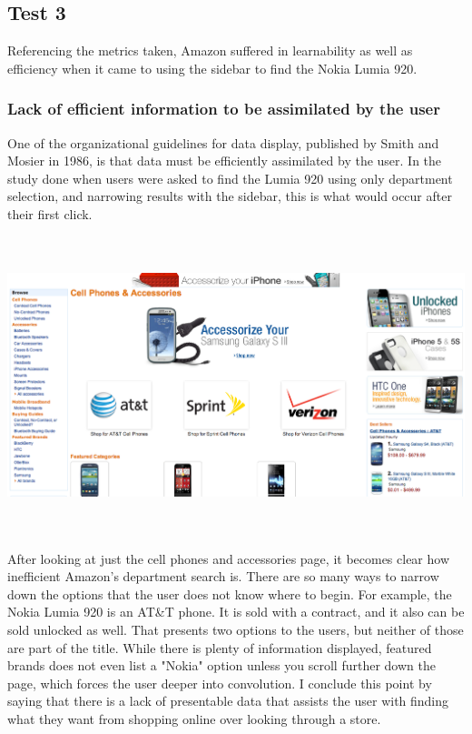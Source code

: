 \documentclass[11pt, oneside]{article}   	%
\begin{document}
\subsection{Test 3}
Referencing the metrics taken, Amazon suffered in learnability as well as efficiency when it came to using the sidebar to find the Nokia Lumia 920.
\subsubsection{Lack of efficient information to be assimilated by the user}
One of the organizational guidelines for data display, published by Smith and Mosier in 1986, is that data must be efficiently assimilated by the user. In the study done when users were asked to find the Lumia 920 using only department selection, and narrowing results with the sidebar, this is what would occur after their first click.

\includegraphics[width=6in, height=3.4in]{Amazon3}

After looking at just the cell phones and accessories page, it becomes clear how inefficient Amazon's department search is. There are so many ways to narrow down the options that the user does not know where to begin. For example, the Nokia Lumia 920 is an AT\&T phone. It is sold with a contract, and it also can be sold unlocked as well. That presents two options to the users, but neither of those are part of the title. While there is plenty of information displayed, featured brands does not even list a "Nokia" option unless you scroll further down the page, which forces the user deeper into convolution. I conclude this point by saying that there is a lack of presentable data that assists the user with finding what they want from shopping online over looking through a store.
\end{document}

